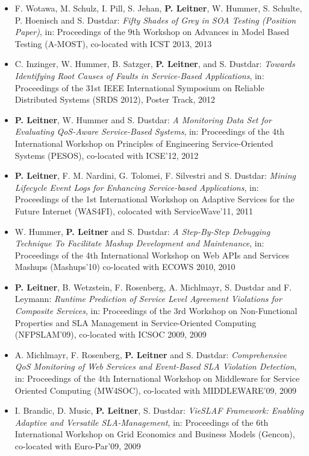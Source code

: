 \documentclass[paper=letter,fontsize=11pt]{scrartcl} %
\begin{document}
\begin{itemize}
\item F. Wotawa, M. Schulz, I. Pill, S. Jehan, \textbf{P. Leitner}, W. Hummer, S. Schulte, P. Hoenisch and S. Dustdar: \emph{Fifty Shades of Grey in SOA Testing (Position Paper)}, in: Proceedings of the 9th Workshop on Advances in Model Based Testing (A-MOST), co-located with ICST 2013, 2013
\item C. Inzinger, W. Hummer, B. Satzger, \textbf{P. Leitner}, and S. Dustdar:
\emph{Towards Identifying Root Causes of Faults in Service-Based Applications}, in: Proceedings of the 31st IEEE International Symposium on Reliable Distributed Systems (SRDS 2012), Poster Track, 2012
\item \textbf{P. Leitner}, W. Hummer and S. Dustdar:
\emph{A Monitoring Data Set for Evaluating QoS-Aware Service-Based Systems}, in: Proceedings of the 4th International Workshop on Principles of Engineering Service-Oriented Systems (PESOS), co-located with ICSE'12, 2012
\item \textbf{P. Leitner}, F. M. Nardini, G. Tolomei, F. Silvestri
and S. Dustdar: \emph{Mining Lifecycle Event Logs for Enhancing
Service-based Applications}, in: Proceedings of the 1st International Workshop on Adaptive Services
for the Future Internet (WAS4FI), colocated with ServiceWave'11, 2011
\item W. Hummer, \textbf{P. Leitner} and S. Dustdar: \emph{A Step-By-Step Debugging Technique To Facilitate Mashup Development and Maintenance}, in: Proceedings of the 4th International Workshop on Web APIs and Services Mashups (Mashups'10) co-located with ECOWS 2010, 2010
\item \textbf{P. Leitner}, B. Wetzstein, F. Rosenberg, A. Michlmayr, S. Dustdar and F. Leymann: \emph{Runtime Prediction of Service Level Agreement Violations for Composite Services}, in: Proceedings of the 3rd Workshop on Non-Functional Properties and SLA Management in Service-Oriented Computing (NFPSLAM'09), co-located with ICSOC 2009, 2009
\item A. Michlmayr, F. Rosenberg, \textbf{P. Leitner} and S. Dustdar: \emph{Comprehensive QoS Monitoring of Web Services and Event-Based SLA Violation Detection}, in: Proceedings of the 4th International Workshop on Middleware for Service Oriented Computing (MW4SOC), co-located with MIDDLEWARE'09, 2009
\item I. Brandic, D. Music, \textbf{P. Leitner}, S. Dustdar: \emph{VieSLAF Framework: Enabling Adaptive and Versatile SLA-Management}, in: Proceedings of the 6th International Workshop on Grid Economics and Business Models (Gencon), co-located with Euro-Par'09, 2009

\end{itemize}
\end{document}
